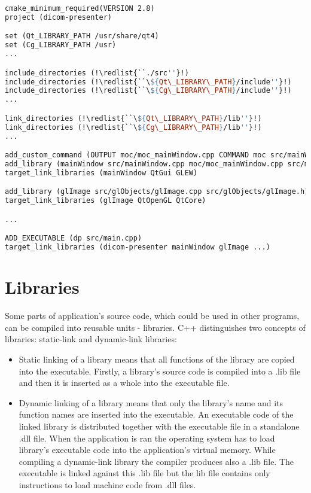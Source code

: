 \begin{lstlisting}[caption={CMake script for application compilation.}, language=make, morekeywords={cmake_minimum_required, project, set, include_directories, link_directories, add_custom_command, OUTPUT, COMMAND, add_library, target_link_libraries, ADD_EXECUTABLE},keywordstyle=\small\color{LightGreen}]
cmake_minimum_required(VERSION 2.8)
project (dicom-presenter)

set (Qt_LIBRARY_PATH /usr/share/qt4)
set (Cg_LIBRARY_PATH /usr)
...

include_directories (!\redlist{``./src''}!)
include_directories (!\redlist{``\${Qt\_LIBRARY\_PATH}/include''}!)
include_directories (!\redlist{``\${Cg\_LIBRARY\_PATH}/include''}!)
...

link_directories (!\redlist{``\${Qt\_LIBRARY\_PATH}/lib''}!)
link_directories (!\redlist{``\${Cg\_LIBRARY\_PATH}/lib''}!)
...

add_custom_command (OUTPUT moc/moc_mainWindow.cpp COMMAND moc src/mainWindow.h > moc/moc_mainWindow.cpp)
add_library (mainWindow src/mainWindow.cpp moc/moc_mainWindow.cpp src/mainWindow.h)
target_link_libraries (mainWindow QtGui GLEW)

add_library (glImage src/glObjects/glImage.cpp src/glObjects/glImage.h)
target_link_libraries (glImage QtOpenGL QtCore)

...

ADD_EXECUTABLE (dp src/main.cpp)
target_link_libraries (dicom-presenter mainWindow glImage ...)
\end{lstlisting}

\section{Libraries}
Some parts of application's source code, which could be used in other programs, can be compiled into reusable units - libraries. C++ distinguishes two concepts of libraries: static-link and dynamic-link libraries:

\begin{itemize}
\item Static linking of a library means that all functions of the library are copied into the executable. Firstly, a library's source code is compiled into a .lib file and then it is inserted as a whole into the executable file.
\item Dynamic linking of a library means that only the library's name and its function names are inserted into the executable. An executable code of the linked library is distributed together with the executable file in a standalone .dll file. When the application is ran the operating system has to load library's executable code into the application's virtual memory. While compiling a dynamic-link library the compiler produces also a .lib file. The executable is linked against this .lib file but the lib file contains only instructions to load machine code from .dll files.
\end{itemize}

